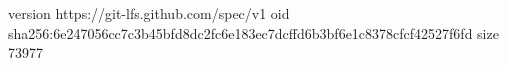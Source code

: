version https://git-lfs.github.com/spec/v1
oid sha256:6e247056cc7c3b45bfd8dc2fc6e183ec7dcffd6b3bf6e1c8378cfcf42527f6fd
size 73977
